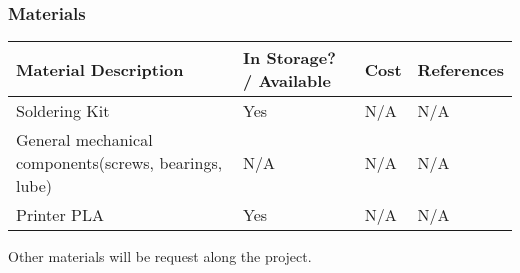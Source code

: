 \documentclass[a4paper,12pt]{article}
\begin{document}
		\subsubsection{Materials}
		\begin{center}
		\begin{table}[H]
			\begin{tabular}{||p{3cm}|p{3cm}|p{3cm}|p{3cm}||}
			\hline
			Material Description & In Storage? / Available & Cost & References \\ \hline
			Soldering Kit & Yes & N/A & N/A\\ \hline
			General mechanical components(screws, bearings, lube) & N/A & N/A &N/A \\ \hline
			Printer PLA & Yes & N/A & N/A \\ \hline
			\end{tabular}
		\end{table}
		\end{center}
		Other materials will be request along the project.
\end{document}

